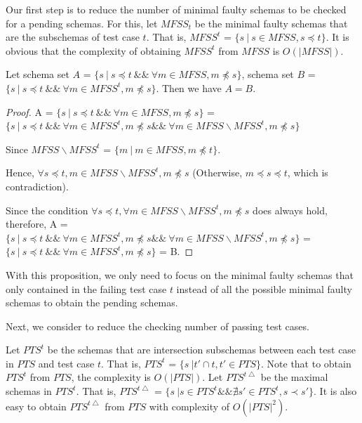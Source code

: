 Our first step is to reduce the number of minimal faulty schemas to be checked for a pending schemas.  For this, let $MFSS_{t}$ be the minimal faulty schemas that are the subschemas of test case $t$. That is, $MFSS^{t}$ = $\{ s\ | \ s \in MFSS, s \preceq t \}$.  It is obvious that the complexity of obtaining $MFSS^{t}$ from $MFSS$ is $O(|MFSS|)$.



\begin{proposition}\label{pro:mfssintequal}
Let schema set $A$ = $\{ s\ |\ s \preceq t\ \&\&\ \forall m \in MFSS,  m \npreceq s \}$,  schema set $B$ = $\{ s\ |\ s \preceq t\ \&\&\ \forall m \in MFSS^{t},  m \npreceq s \}$. Then we have $A = B$.
\end{proposition}

\begin{proof}

A = $\{ s\ |\  s \preceq t\ \&\&\ \forall m \in MFSS,  m \npreceq s \}$
 =
$\{ s\ |\  s \preceq t\ \&\&\ \forall m \in MFSS^{t},  m \npreceq s \&\&\   \forall m \in MFSS \backslash MFSS^{t},  m \npreceq s  \}$

Since $MFSS \backslash MFSS^{t}$ = $\{ m \ | \ m \in MFSS, m \npreceq t \}$.

Hence, $\forall s \preceq t, m \in MFSS \backslash MFSS^{t},  m \npreceq s$ (Otherwise, $m \preceq s \preceq t$, which is contradiction).

Since the condition $\forall s \preceq t, \forall m \in MFSS \backslash MFSS^{t},  m \npreceq s $ does always hold, therefore, A =
$\{ s\ |\  s \preceq t\ \&\&\ \forall m \in MFSS^{t},  m \npreceq s \&\&\   \forall m \in MFSS \backslash MFSS^{t},  m \npreceq s  \}$  =
$\{ s\ |\  s \preceq t\ \&\&\ \forall m \in MFSS^{t},  m \npreceq s \}$ = B.
\end{proof}

With this proposition, we only need to focus on the minimal faulty schemas that only contained in the failing test case $t$ instead of all the possible minimal faulty schemas to obtain the pending schemas. %

Next, we consider to reduce the checking number of passing test cases.

Let $PTS^{t}$ be the schemas that are intersection subschemas between each test case in $PTS$ and test case $t$. That is, $PTS^{t}$ = $\{ s\ | t' \cap t, t' \in PTS \}$. Note that to obtain $PTS^{t}$ from $PTS$, the complexity is $O(|PTS|)$.  Let $PTS^{t\bigtriangleup}$ be the maximal schemas in $PTS^{t}$. That is, $PTS^{t\bigtriangleup}$ = $\{ s\ |  s \in PTS^{t} \&\& \nexists s'  \in PTS^{t}, s \prec s' \}$.  It is also easy to obtain $PTS^{t\bigtriangleup}$ from $PTS$ with complexity of $O(|PTS|^{2})$.


